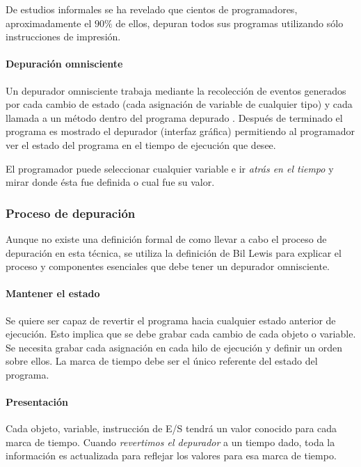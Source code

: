 \documentclass[12pt,legalpaper]{report}
\begin{document}
De estudios informales \cite{odb} se ha revelado que cientos de programadores, aproximadamente el $90\%$ de ellos, depuran todos sus programas utilizando sólo instrucciones de impresión.


			\paragraph{Depuración omnisciente}

Un depurador omnisciente trabaja mediante la recolección de eventos generados por cada cambio de estado (cada asignación de variable de cualquier tipo) y cada llamada a un método dentro del programa depurado \cite{tod,odb}.  Después de terminado el programa es mostrado el depurador (interfaz gráfica) permitiendo al programador ver el estado del programa en el tiempo de ejecución que desee.  

El programador puede seleccionar cualquier variable e ir \textit{atrás en el tiempo} y mirar donde ésta fue definida o cual fue su valor.


			\subsubsection{Proceso de depuración}

Aunque no existe una definición formal de como llevar a cabo el proceso de depuración en esta técnica, se utiliza la definición de Bil Lewis \cite{odb} para explicar el proceso y componentes esenciales que debe tener un depurador omnisciente.

				\paragraph{Mantener el estado}

Se quiere ser capaz de revertir el programa hacia cualquier estado anterior de ejecución.  Esto implica que se debe grabar cada cambio de cada objeto o variable.  Se necesita grabar cada asignación en cada hilo de ejecución y definir un orden sobre ellos.  La marca de tiempo debe ser el único referente del estado del programa.

				\paragraph{Presentación}

Cada objeto, variable, instrucción de E/S tendrá un valor conocido para cada marca de tiempo.  Cuando \textit{revertimos el depurador} a un tiempo dado, toda la información es actualizada para reflejar los valores para esa marca de tiempo.
\end{document}
